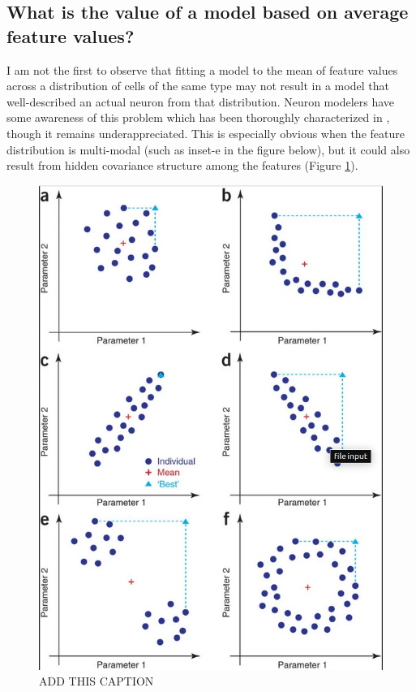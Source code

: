 \subsection{What is the value of a model based on average feature values?}
\label{sec:mean-model}
I am not the first to observe that fitting a model to the mean of feature values across a distribution of cells of the same type may not result in a model that well-described an actual neuron from that distribution.
Neuron modelers have some awareness of this problem which has been thoroughly characterized in \cite{marder2011multiple}, though it remains underappreciated.
This is especially obvious when the feature distribution is multi-modal (such as inset-e in the figure below), but it could also result from hidden covariance structure among the features (Figure \ref{fig:eve_marder}).

\begin{figure}
\begin{center}

\includegraphics[scale=0.65]{figures/eve_marder.png}
\end{center}
\caption[Lessons from Marder]{ADD THIS CAPTION}
\label{fig:eve_marder}
\end{figure}



